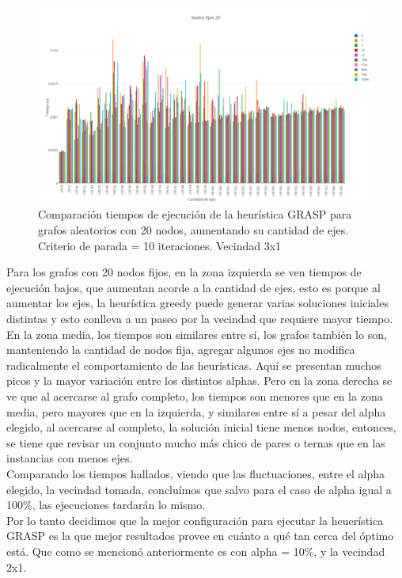   \begin{figure}[h!]
   \begin{center}
 	\includegraphics[scale=0.35]{imagenes/grasp/20nodos-10repes-v2.png}
 	\caption{Comparaci\'on tiempos de ejecuci\'on de la heur\'istica GRASP para grafos aleatorios con 20 nodos, aumentando su cantidad de ejes. Criterio de parada = 10 iteraciones. Vecindad 3x1}
   \end{center}
 \end{figure}
\newpage

Para los grafos con 20 nodos fijos, en la zona izquierda se ven tiempos de ejecuci\'on bajos, que aumentan acorde a la cantidad de ejes, esto es porque al aumentar los ejes, la heur\'istica greedy puede generar varias soluciones iniciales distintas y esto conlleva a un paseo por la vecindad que requiere mayor tiempo. En la zona media, los tiempos son similares entre s\'i, los grafos tambi\'en lo son, manteniendo la cantidad de nodos fija, agregar algunos ejes no modifica radicalmente el comportamiento de las heur\'isticas. Aqu\'i se presentan muchos picos y la mayor variaci\'on entre los distintos alphas. Pero en la zona derecha se ve que al acercarse al grafo completo, los tiempos son menores que en la zona media, pero mayores que en la izquierda, y similares entre s\'i a pesar del alpha elegido, al acercarse al completo, la soluci\'on inicial tiene menos nodos, entonces, se tiene que revisar un conjunto mucho m\'as chico de pares o ternas que en las instancias con menos ejes.\\

Comparando los tiempos hallados, viendo que las fluctuaciones, entre el alpha elegido, la vecindad tomada, conclu\'imos que salvo para el caso de alpha igual a 100\%, las ejecuciones tardar\'an lo mismo.\\

Por lo tanto decidimos que la mejor configuraci\'on para ejecutar la heuer\'istica GRASP es la que mejor resultados provee en cu\'anto a qu\'e tan cerca del \'optimo est\'a. Que como se mencion\'o anteriormente es con alpha = 10\%, y la vecindad 2x1.

